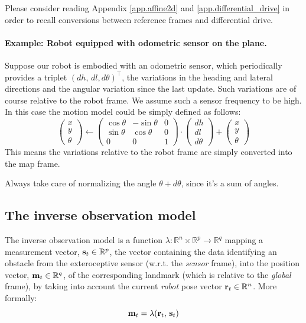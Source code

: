 		Please consider reading Appendix \ref{app.affine2d} and \ref{app.differential_drive} in order to recall conversions between reference frames and differential drive.
		
	\paragraph{Example: Robot equipped with odometric sensor on the plane.}
		Suppose our robot is embodied with an odometric sensor, which periodically provides a triplet $(dh,\, dl, d\theta)^\top$, \ie{} the variations in the heading and lateral directions and the angular variation since the last update. 
		Such variations are of course relative to the robot frame.
		We assume such a sensor frequency to be high.
		In this case the motion model could be simply defined as follows:
		\begin{equation}
			\label{eq.motion.odometrix}
			\left(\begin{array}{c}
				x \\ y \\ \theta
			\end{array}\right)
			\leftarrow
			\left(\begin{array}{ccc}
				\cos{\theta} & -\sin{\theta} & 0 \\
				\sin{\theta} & \cos{\theta} & 0 \\
				0 & 0 & 1
			\end{array}\right)
			\cdot
			\left(\begin{array}{c}
				dh \\
				dl \\
				d\theta
			\end{array}\right)
			+
			\left(\begin{array}{c}
				x \\ y \\ \theta
			\end{array}\right)
		\end{equation}
		This means the variations relative to the robot frame are simply converted into the map frame.
		
		\begin{important}
			Always take care of normalizing the angle $\theta + d\theta$, since it's a sum of angles.
		\end{important}

\subsection{The inverse observation model}
	The inverse observation model is a function $\lambda : \mathbb{R}^n \times \mathbb{R}^p \rightarrow \mathbb{R}^q$ mapping a measurement vector, $\boldsymbol{\mathrm{{s}}}_{t} \in \mathbb{R}^p$, \ie{} the vector containing the data identifying an obstacle from the exteroceptive sensor (w.r.t. the \emph{sensor} frame), into the position vector, $\boldsymbol{\mathrm{{m}}}_{t} \in \mathbb{R}^q$, of the corresponding landmark (which is relative to the \emph{global} frame), by taking into account the current \emph{robot} pose vector $\boldsymbol{\mathrm{{r}}}_t \in \mathbb{R}^n$.
	More formally:
	\[
		\boldsymbol{\mathrm{{m}}}_t = \lambda(\boldsymbol{\mathrm{{r}}}_{t},\, \boldsymbol{\mathrm{{s}}}_t)
	\]
	
